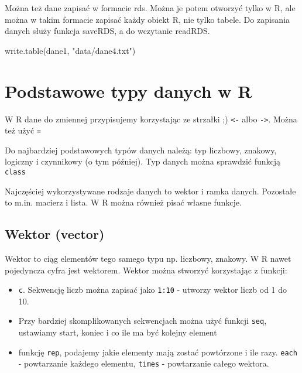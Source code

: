 \documentclass[
]{book}
\newenvironment{Shaded}{\begin{snugshade}}{\end{snugshade}}
\newcommand{\FunctionTok}[1]{\textcolor[rgb]{0.00,0.00,0.00}{#1}}
\newcommand{\NormalTok}[1]{#1}
\newcommand{\StringTok}[1]{\textcolor[rgb]{0.31,0.60,0.02}{#1}}
\begin{document}
Można też dane zapisać w formacie rds. Można je potem otworzyć tylko w R, ale można w takim formacie zapisać każdy obiekt R, nie tylko tabele. Do zapisania danych służy funkcja saveRDS, a do wczytanie readRDS.

\begin{Shaded}
\begin{Highlighting}[]
\FunctionTok{write.table}\NormalTok{(dane1, }\StringTok{"data/dane4.txt"}\NormalTok{)}
\end{Highlighting}
\end{Shaded}

\hypertarget{podstawowe-typy-danych-w-r}{%
\section{Podstawowe typy danych w R}\label{podstawowe-typy-danych-w-r}}

W R dane do zmiennej przypisujemy korzystając ze strzałki ;) \texttt{\textless{}-} albo \texttt{-\textgreater{}}. Można też użyć \texttt{=}

Do najbardziej podstawowych typów danych należą: typ liczbowy, znakowy, logiczny i czynnikowy (o tym później). Typ danych można sprawdzić funkcją \texttt{class}

Najczęściej wykorzystywane rodzaje danych to wektor i ramka danych. Pozostałe to m.in. macierz i lista. W R można również pisać własne funkcje.

\hypertarget{wektor-vector}{%
\subsection{Wektor (vector)}\label{wektor-vector}}

Wektor to ciąg elementów tego samego typu np. liczbowy, znakowy. W R nawet pojedyncza cyfra jest wektorem. Wektor można stworzyć korzystając z funkcji:

\begin{itemize}
\item
  \texttt{c}. Sekwencję liczb można zapisać jako \texttt{1:10} - utworzy wektor liczb od 1 do 10.
\item
  Przy bardziej skomplikowanych sekwencjach można użyć funkcji \texttt{seq}, ustawiamy start, koniec i co ile ma być kolejny element
\item
  funkcję \texttt{rep}, podajemy jakie elementy mają zostać powtórzone i ile razy. \texttt{each} - powtarzanie każdego elementu, \texttt{times} - powtarzanie całego wektora.
\end{itemize}
\end{document}
